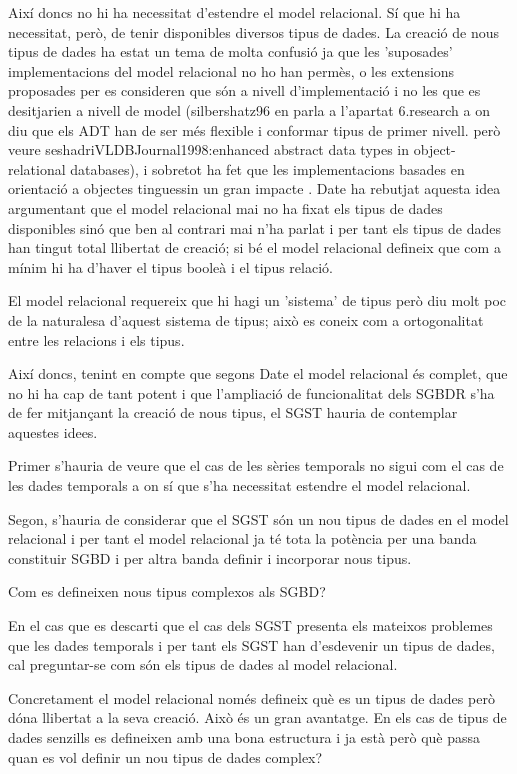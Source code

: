 Així doncs no hi ha necessitat d'estendre el model relacional. Sí que hi ha necessitat, però, de tenir disponibles diversos tipus de dades. La creació de nous tipus de dades ha estat un tema de molta confusió ja que les 'suposades' implementacions del model relacional no ho han permès, o les extensions proposades per \textcite{stonebraker86} es consideren que són a nivell d'implementació i no les que es desitjarien a nivell de model (silbershatz96 en parla a l'apartat 6.research a on diu que els ADT han de ser més flexible i conformar tipus de primer nivell. però veure seshadriVLDBJournal1998:enhanced abstract data types in object-relational databases), i sobretot ha fet que les implementacions basades en orientació a objectes tinguessin un gran impacte . Date ha rebutjat aquesta idea argumentant que el model relacional mai no ha fixat els tipus de dades disponibles sinó que ben al contrari mai n'ha parlat i per tant els tipus de dades han tingut total llibertat de creació; si bé el model relacional defineix que com a mínim hi ha d'haver el tipus booleà i el tipus relació.

El model relacional requereix que hi hagi un 'sistema' de tipus però diu molt poc de la naturalesa d'aquest sistema de tipus; això es coneix com a ortogonalitat entre les relacions i els tipus.



Així doncs, tenint en compte que segons Date el model relacional és complet, que no hi ha cap de tant potent i que l'ampliació de funcionalitat dels SGBDR s'ha de fer mitjançant la creació de nous tipus, el SGST hauria de contemplar aquestes idees. 

Primer s'hauria de veure que el cas de les sèries temporals no sigui com el cas de les dades temporals a on sí que s'ha necessitat estendre el model relacional.

Segon, s'hauria de considerar que el SGST són un nou tipus de dades en el model relacional i per tant el model relacional ja té tota la potència per una banda constituir SGBD i per altra banda definir i incorporar nous tipus.


Com es defineixen nous tipus complexos als SGBD?

En el cas que es descarti que el cas dels SGST presenta els mateixos problemes que les dades temporals i per tant els SGST han d'esdevenir un tipus de dades, cal preguntar-se com són els tipus de dades al model relacional.

Concretament el model relacional només defineix què es un tipus de dades però dóna llibertat a la seva creació. Això és un gran avantatge. En els cas de tipus de dades senzills es defineixen amb una bona estructura i ja està però què passa quan es vol definir un nou tipus de dades complex?

